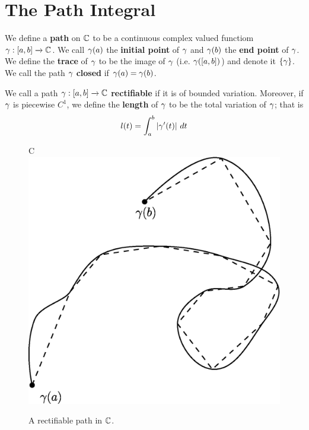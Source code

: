\section{The Path Integral}

\begin{definition}
    We define a \textbf{path} on $\mathbb{C}$ to be a continuous complex valued
    functiom $\gamma:[a,b] \xrightarrow{} \mathbb{C}$. We call $\gamma(a)$ the \textbf{initial
    point} of $\gamma$ and $\gamma(b)$ the \textbf{end point} of $\gamma$. We define the
    \textbf{trace} of $\gamma$ to be the image of  $\gamma$  (i.e. $\gamma([a,b])$) and
    denote it $\{\gamma\}$. We call the path $\gamma$  \textbf{closed} if $\gamma(a)=\gamma(b)$.
\end{definition}

\begin{definition}
    We call a path $\gamma:[a,b] \xrightarrow{} \mathbb{C}$ \textbf{rectifiable} if it is of
    bounded variation. Moreover, if $\gamma$ is piecewise $C^1$, we  define the
    \textbf{length} of $\gamma$ to be the total variation of $\gamma$; that is
    \begin{equation*}
        l(t)=\int_a^b{|\gamma'(t)| \ dt}
    \end{equation*}
\end{definition}

\begin{figure}[h]
    C\centering
    \includegraphics[scale=0.5]{Figures/Chapter4/rectifiable_curve.eps}
    \caption{A rectifiable path in $\mathbb{C}$.}
    \label{figure_4.1}
\end{figure}

